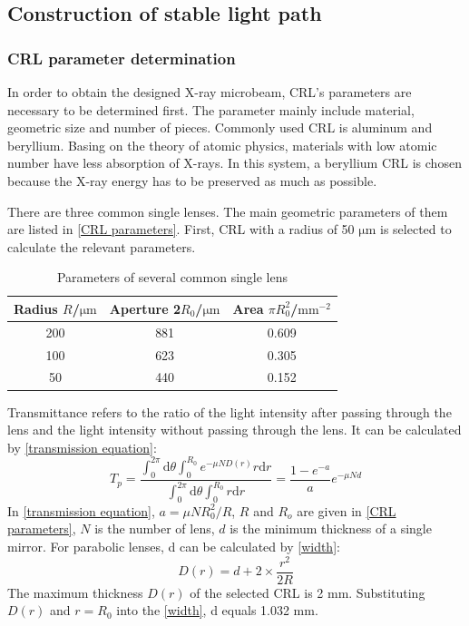 \documentclass{Head}
\begin{document}
\subsection{Construction of stable light path}
\subsubsection{CRL parameter determination}
\label{CRL parameter determination}
In order to obtain the designed X-ray microbeam, CRL's parameters are necessary to be determined first.
The parameter mainly include material, geometric size and number of pieces.
Commonly used CRL is aluminum and beryllium.
Basing on the theory of atomic physics, materials with low atomic number have less absorption of X-rays. In this system, a beryllium CRL is chosen because the X-ray energy has to be preserved as much as possible.



There are three common single lenses.
The main geometric parameters of them are listed in \autoref{CRL parameters}.
First, CRL with a radius of 50 $\mathrm{\mu m}$ is selected to calculate the relevant parameters.
\begin{table}
    \centering
    \caption{Parameters of several common single lens}
    \begin{tabular}{ccc}
        \toprule
        Radius $R$/$\mathrm{\mu m}$ & Aperture 2$R_0$/$\mathrm{\mu m}$ & Area $\pi R_0^2$/$\mathrm{mm^{-2}}$ \\
        \midrule
        200                         & 881                              & 0.609                               \\
        100                         & 623                              & 0.305                               \\
        50                          & 440                              & 0.152                               \\
        \bottomrule
    \end{tabular}
    \label{CRL parameters}
\end{table}


Transmittance refers to the ratio of the light intensity after passing through the lens and the light intensity without passing through the lens.
It can be calculated by \autoref{transmission equation}\cite{Lengeler:ht2006}:
\begin{equation}
    T_p=\frac{\int_0^{2\pi}\mathrm{d}\theta\int_0^{R_0}e^{-\mu ND(r)}r\mathrm{d}r}{\int_0^{2\pi}\mathrm{d}\theta\int_0^{R_0}r\mathrm{d}r}=\frac{1-e^{-a}}{a}e^{-\mu Nd}
    \label{transmission equation}
\end{equation}
In \autoref{transmission equation}, $a=\mu N R_0^2/R$, $R$ and $R_o$ are given in \autoref{CRL parameters}, $N$ is the number of lens, $d$ is the minimum thickness of a single mirror.
For parabolic lenses, d can be calculated by \autoref{width}:
\begin{equation}
    D(r)=d+2\times \frac{r^2}{2R}
    \label{width}
\end{equation}
The maximum thickness $D(r)$ of the selected CRL is 2 mm.
Substituting $D(r)$ and $r=R_0$ into the \autoref{width}, d equals 1.032 mm.
\end{document}
